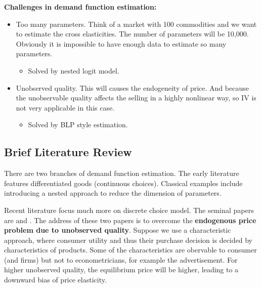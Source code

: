 \documentclass{book}
\theoremstyle{plain}
\theoremstyle{definition}
\begin{document}
\noindent
\textbf{Challenges in demand function estimation:}
\begin{itemize}
	\item Too many parameters. Think of a market with 100 commodities and we want to estimate the cross elasticities. The number of parameters will be 10,000. Obviously it is impossible to have enough data to estimate so many parameters.
	\begin{itemize}
		\item Solved by nested logit model.
	\end{itemize}
	\item Unobserved quality. This will causes the endogeneity of price. And because the unobservable quality affects the selling in a highly nonlinear way, so IV is not very applicable in this case.
	\begin{itemize}
		\item Solved by BLP style estimation.
	\end{itemize}
\end{itemize}


\subsection{Brief Literature Review} %
\label{sub:brief_literature_review}

There are two branches of demand function estimation.
The early literature features differentiated goods (continuous choices). Classical examples include \cite{Hausman:1994km} introducing a nested approach to reduce the dimension of parameters.

Recent literature focus much more on discrete choice model. The seminal papers are \cite{Berry:1994jh} and \cite{berry.et.al.1995.emca}.
The address of these two papers is to overcome the \textbf{endogenous price problem due to unobserved quality}. 
Suppose we use a characteristic approach, where consumer utility and thus their purchase decision is decided by characteristics of products. 
Some of the characteristics are obervable to consumer (and firms) but not to econometricians, for example the advertisement. 
For higher unobserved quality, the equilibrium price will be higher, leading to a downward bias of price elasticity.
\end{document}
